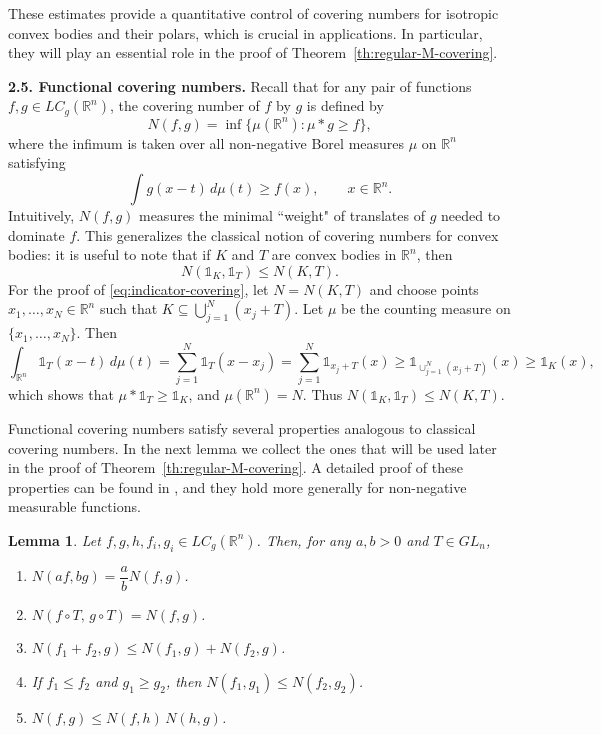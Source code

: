 \documentclass[11pt,leqno]{article}
\newtheorem{lemma}[theorem]{Lemma}
\theoremstyle{definition}
\theoremstyle{remark}
\numberwithin{equation}{section}
\newcommand{\ls}{\leqslant}
\newcommand{\gr}{\geqslant}
\begin{document}
These estimates provide a quantitative control of covering numbers for isotropic convex bodies and their polars, which is crucial in applications.  
In particular, they will play an essential role in the proof of Theorem~\ref{th:regular-M-covering}.

\bigskip 

\textbf{2.5. Functional covering numbers.}
Recall that for any pair of functions $f,g \in LC_g(\mathbb{R}^n)$, the covering number of $f$ by $g$ is defined by
$$N(f,g)= \inf\{\mu(\mathbb{R}^n) : \mu \ast g \gr f\},$$
where the infimum is taken over all non-negative Borel measures $\mu$ on $\mathbb{R}^n$ satisfying
$$\int g(x-t)\, d\mu(t) \gr f(x),\qquad x \in \mathbb{R}^n.$$
Intuitively, $N(f,g)$ measures the minimal ``weight" of translates of $g$ needed to dominate $f$.  
This generalizes the classical notion of covering numbers for convex bodies: it is useful to note that 
if $K$ and $T$ are convex bodies in $\mathbb{R}^n$, then
\begin{equation} \label{eq:indicator-covering}
N(\mathds{1}_K,\mathds{1}_T) \ls N(K,T).
\end{equation}
For the proof of \eqref{eq:indicator-covering}, let $N = N(K,T)$ and choose points
$x_1,\ldots,x_N \in \mathbb{R}^n$ such that $K \subseteq \bigcup_{j=1}^N (x_j + T)$.
Let $\mu$ be the counting measure on $\{x_1,\ldots ,x_N\}$. Then
$$\int_{\mathbb{R}^n}\mathds{1}_T(x-t)\, d\mu(t)= \sum_{j=1}^N \mathds{1}_T(x-x_j)
= \sum_{j=1}^N \mathds{1}_{x_j+T}(x)\gr \mathds{1}_{\cup_{j=1}^N (x_j+T)}(x)\gr \mathds{1}_K(x),$$
which shows that $\mu \ast \mathds{1}_T \gr \mathds{1}_K$, and $\mu(\mathbb{R}^n)=N$.
Thus $N(\mathds{1}_K,\mathds{1}_T)\ls N(K,T)$.

\smallskip

Functional covering numbers satisfy several properties analogous to classical covering numbers.  
In the next lemma we collect the ones that will be used later in the proof of Theorem~\ref{th:regular-M-covering}.
A detailed proof of these properties can be found in \cite[Section~2]{Artstein-Slomka-2021}, 
and they hold more generally for non-negative measurable functions.

\begin{lemma}\label{lem:properties}
Let $f,g,h,f_i,g_i \in LC_g(\mathbb{R}^n)$. Then, for any $a,b>0$ and $T\in GL_n$,
\begin{enumerate}
\item[{\rm (i)}] $N(af,bg)=\dfrac{a}{b}N(f,g)$.
\item[{\rm (ii)}] $N(f\circ T,\, g\circ T)=N(f,g)$.
\item[{\rm (iii)}] $N(f_1+f_2,g)\ls N(f_1,g)+N(f_2,g)$.
\item[{\rm (iv)}] If $f_1 \ls f_2$ and $g_1 \gr g_2$, then $N(f_1,g_1)\ls N(f_2,g_2)$.
\item[{\rm (v)}] $N(f,g)\ls N(f,h)\,N(h,g)$.
\end{enumerate}
\end{lemma}
\end{document}
